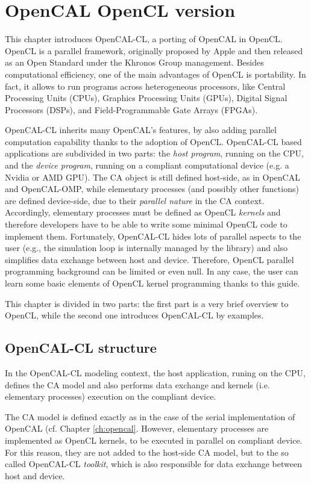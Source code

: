 \chapter{OpenCAL OpenCL version}\label{ch:opencal-cl}


This chapter introduces OpenCAL-CL, a porting of OpenCAL in
OpenCL. OpenCL is a parallel framework, originally proposed by Apple
and then released as an Open Standard under the Khronos Group
management. Besides computational efficiency, one of the main
advantages of OpenCL is portability. In fact, it allows to run
programs across heterogeneous processors, like Central Processing Units
(CPUs), Graphics Processing Units (GPUs), Digital Signal Processors
(DSPs), and Field-Programmable Gate Arrays (FPGAs).

OpenCAL-CL inherits many OpenCAL's features, by also adding parallel
computation capability thanks to the adoption of OpenCL. OpenCAL-CL
based applications are subdivided in two parts: the \emph{host
  program}, running on the CPU, and the \emph{device program}, running
on a compliant computational device (e.g. a Nvidia or AMD GPU). The CA
object is still defined host-side, as in OpenCAL and OpenCAL-OMP,
while elementary processes (and possibly other functions) are defined
device-side, due to their \textsl{parallel nature} in the CA
context. Accordingly, elementary processes must be defined as OpenCL
\emph{kernels} and therefore developers have to be able to write some
minimal OpenCL code to implement them. Fortunately, OpenCAL-CL hides
lots of parallel aspects to the user (e.g., the simulation loop is
internally managed by the library) and also simplifies data exchange
between host and device. Therefore, OpenCL parallel programming
background can be limited or even null. In any case, the user can
learn some basic elements of OpenCL kernel programming thanks to this
guide.

This chapter is divided in two parts: the first part is a very brief
overview to OpenCL, while the second one introduces OpenCAL-CL by
examples.

\section{OpenCAL-CL structure}\label{sec:opencalclstructure}
In the OpenCAL-CL modeling context, the host application, runing on
the CPU, defines the CA model and also performs data exchange and
kernels (i.e. elementary processes) execution on the compliant device.

The CA model is defined exactly as in the case of the serial
implementation of OpenCAL (cf. Chapter \ref{ch:opencal}. However,
elementary processes are implemented as OpenCL kernels, to be executed
in parallel on compliant device. For this reason, they are not added
to the host-side CA model, but to the so called OpenCAL-CL \emph{toolkit},
which is also responsible for data exchange between host and device.

